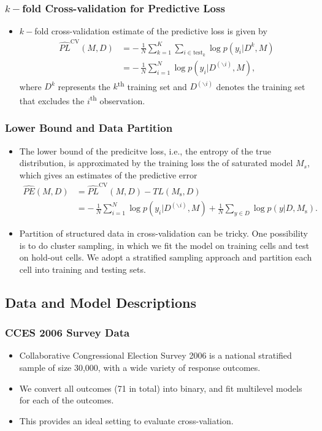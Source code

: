 \documentclass[xetex,mathserif,serif]{beamer}
\begin{document}
\begin{frame}
  \frametitle{$k-$fold Cross-validation for Predictive Loss}
  \begin{itemize}
  \item $k-$fold cross-validation estimate of the predictive loss is given by
    \begin{align*}
      \widehat{PL}^{\text{CV}}(M, D) &=-\,\frac{1}{N}\sum_{k=1}^K\sum_{i\in
        \text{test}_k}\log p(y_i|D^k, M)\\
      &=-\,\frac{1}{N}\sum_{i=1}^N\log p(y_i|D^{(\backslash i)}, M),
\end{align*}
where $D^k$ represents the $k$\textsuperscript{th} training set and
$D^{(\backslash i)}$ denotes the training set that excludes the
$i$\textsuperscript{th} observation.
  \end{itemize}
\end{frame}

\begin{frame}
  \frametitle{Lower Bound and Data Partition}
  \begin{itemize}
  \item The lower bound of the predicitve loss, i.e., the entropy of the true
    distribution, is approximated by the training loss the of saturated model
    $M_s$, which gives an estimates of the predictive error
    \begin{align*}
      \widehat{PE}(M, D)&=\widehat{PL}^{\text{CV}}(M,D)-TL(M_{\text{s}},D)\\  \label{eq:esti_preerror}
      &= -\,\frac{1}{N}\sum_{i=1}^N\log p(y_i|D^{(\backslash i)},
      M)+\frac{1}{N}\sum_{y\in D}\log p(y | D, M_{\text{s}}).
    \end{align*}
  \item Partition of structured data in cross-validation can be tricky. One
    possibility is to do cluster sampling, in which we fit the model on training
    cells and test on hold-out cells. We adopt a stratified sampling approach and
    partition each cell into training and testing sets.
  \end{itemize}
\end{frame}
\subsection{Data and Model Descriptions}
\begin{frame}
  \frametitle{CCES 2006 Survey Data}
  \begin{itemize}
  \item Collaborative Congressional Election Survey 2006 is a national stratified
    sample of size 30,000, with a wide variety of response outcomes. 
  \item We convert all outcomes (71 in total) into binary, and fit multilevel
    models for each of the outcomes.
  \item This provides an ideal setting to evaluate cross-valiation.
  \end{itemize}
\end{frame}
\end{document}
